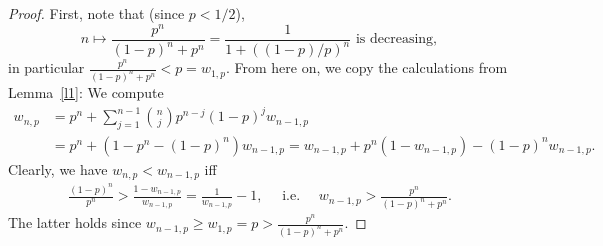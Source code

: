 \documentclass{article}
\theoremstyle{definition}
\theoremstyle{step} \newtheorem{step}{Step}
\begin{document}
\begin{proof}
  First, note that (since $p < 1/2$),
  $$ n \mapsto \frac{p^n}{(1-p)^n + p^n} = \frac{1}{1 + ((1-p)/p)^n}
  \text{ is decreasing},$$ in particular $\frac{p^n}{(1-p)^n + p^n} <
  p = w_{1,p}$. From here on, we copy the calculations from
  Lemma~\ref{l1}: We compute
  \begin{align*}
    w_{n,p} & = p^n + \sum_{j=1}^{n-1} \binom n j p^{n-j} (1-p)^j
    w_{n-1,p} \\ & = p^n + (1 - p^n - (1-p)^n)w_{n-1,p} = w_{n-1,p} +
    p^n(1 - w_{n-1,p}) - (1-p)^n w_{n-1,p}.
  \end{align*}
  Clearly, we have $w_{n,p} < w_{n-1,p}$ iff
  \begin{align*}
    \frac{(1-p)^n}{p^n} > \frac{1 - w_{n-1,p}}{w_{n-1,p}} =
    \frac{1}{w_{n-1,p}} - 1, \quad \text{ i.e. } \quad w_{n-1,p} >
    \frac{p^n}{(1-p)^n + p^n}.
  \end{align*}
  The latter holds since $w_{n-1,p} \geq w_{1,p} = p >
  \frac{p^n}{(1-p)^n + p^n}$.
\end{proof}

\newpage
\end{document}
